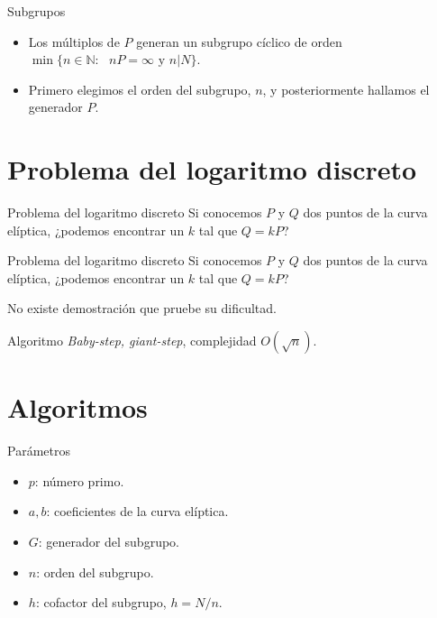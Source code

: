 \documentclass[12pt]{beamer}
\begin{document}
\begin{frame}[fragile]{Subgrupos}
  \begin{itemize}
  \item Los múltiplos de $P$ generan un subgrupo cíclico de orden $\min\{ n \in \mathbb{N}:\text{ } nP = \infty \text{ y } n | N\}$.\\
    
  \item Primero elegimos el orden del subgrupo, $n$, y posteriormente hallamos el generador $P$.
  \end{itemize}
  
\end{frame}

\section{Problema del logaritmo discreto}\label{dis_log}
\begin{frame}[fragile]{Problema del logaritmo discreto}
Si conocemos $ P $ y $ Q $ dos puntos de la curva elíptica, ¿podemos encontrar un $ k $ tal que $ Q = kP $?  
\end{frame}
\begin{frame}[fragile]{Problema del logaritmo discreto}
Si conocemos $ P $ y $ Q $ dos puntos de la curva elíptica, ¿podemos encontrar un $ k $ tal que $ Q = kP $?\\
\vspace{3mm}
  
No existe demostración que pruebe su dificultad.\\
\vspace{3mm}

Algoritmo \textit{Baby-step, giant-step}, complejidad $O(\sqrt{n})$.\\
\end{frame}

\section*{Algoritmos}
\begin{frame}[fragile]{Parámetros}
  \begin{itemize}
	\item $ p $: número primo.
	\item $ a, b $: coeficientes de la curva elíptica.
	\item $ G $: generador del subgrupo.
	\item $ n $: orden del subgrupo.
	\item $ h $:  cofactor del subgrupo, $h = N / n$.
\end{itemize}
\end{frame}
\end{document}

